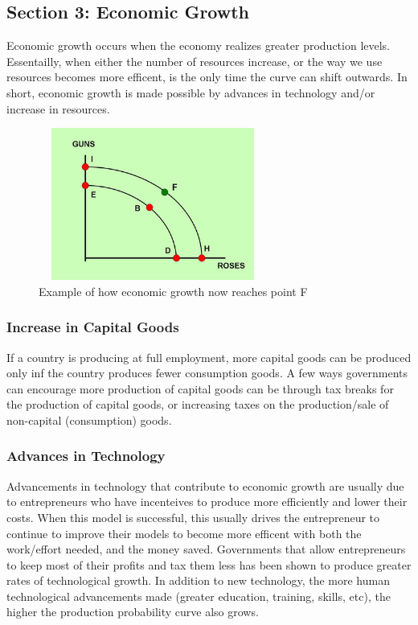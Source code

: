 \documentclass[a4paper, 12pt] {article}
\begin{document}
\subsection{Section 3: Economic Growth}
Economic growth occurs when the economy realizes greater production levels.
Essentailly, when either the number of resources increase, or the way we use
resources becomes more efficent, is the only time the curve can shift outwards.
In short, economic growth is made possible by advances in technology and/or
increase in resources.

\begin{figure}[h]
    \centering
    \includegraphics[width=7.5cm, height=5cm]{economic_growth_graph.jpg}
    \caption{Example of how economic growth now reaches point F}
    \label{fig:GnR2}
\end{figure}

\subsubsection{Increase in Capital Goods}
If a country is producing at full employment, more capital goods can be produced
only inf the country produces fewer consumption goods. A few ways governments
can encourage more production of capital goods can be through tax breaks for the
production of capital goods, or increasing taxes on the production/sale of
non-capital (consumption) goods.

\subsubsection{Advances in Technology}
Advancements in technology that contribute to economic growth are usually due to
entrepreneurs who have incenteives to produce more efficiently and lower their
costs. When this model is successful, this usually drives the entrepreneur to 
continue to improve their models to become more efficent with both the work/effort
needed, and the money saved. Governments that allow entrepreneurs to keep most of
their profits and tax them less has been shown to produce greater rates of
technological growth. In addition to new technology, the more human technological
advancements made (greater education, training, skills, etc), the higher the 
production probability curve also grows.
\end{document}
